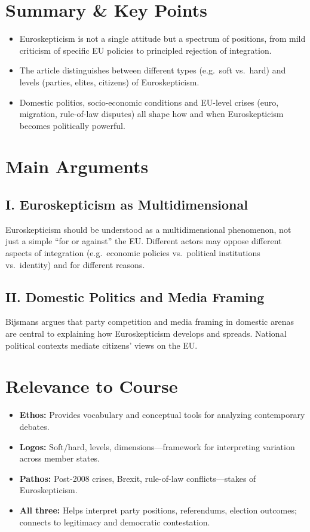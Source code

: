\documentclass[11pt,a4paper]{article}
\begin{document}
\section*{Summary \& Key Points}

\begin{itemize}
\item Euroskepticism is not a single attitude but a spectrum of positions, from mild criticism of specific EU policies to principled rejection of integration.
\item The article distinguishes between different types (e.g.\ soft vs.\ hard) and levels (parties, elites, citizens) of Euroskepticism.
\item Domestic politics, socio-economic conditions and EU-level crises (euro, migration, rule-of-law disputes) all shape how and when Euroskepticism becomes politically powerful.
\end{itemize}

\section*{Main Arguments}

\subsection*{I. Euroskepticism as Multidimensional}

Euroskepticism should be understood as a multidimensional phenomenon, not just a simple ``for or against'' the EU. Different actors may oppose different aspects of integration (e.g.\ economic policies vs.\ political institutions vs.\ identity) and for different reasons.

\subsection*{II. Domestic Politics and Media Framing}

Bijsmans argues that party competition and media framing in domestic arenas are central to explaining how Euroskepticism develops and spreads. National political contexts mediate citizens' views on the EU.

\section*{Relevance to Course}

\begin{itemize}
\item \textbf{Ethos:} Provides vocabulary and conceptual tools for analyzing contemporary debates.
\item \textbf{Logos:} Soft/hard, levels, dimensions---framework for interpreting variation across member states.
\item \textbf{Pathos:} Post-2008 crises, Brexit, rule-of-law conflicts---stakes of Euroskepticism.
\item \textbf{All three:} Helps interpret party positions, referendums, election outcomes; connects to legitimacy and democratic contestation.
\end{itemize}
\end{document}
